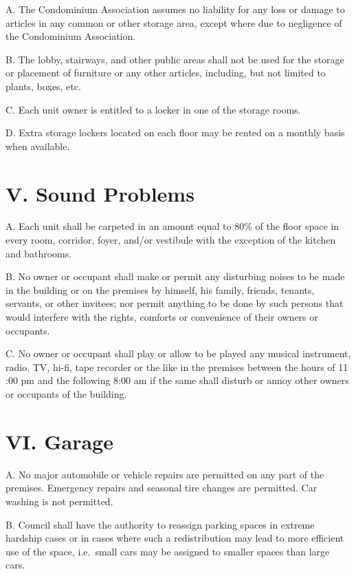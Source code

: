 \documentclass[
]{book}
\begin{document}
A. The Condominium Association assumes no liability for any loss or damage to articles in any common or other storage area, except where due to negligence of the Condominium Association.

B. The lobby, stairways, and other public areas shall not be used for the storage or placement of furniture or any other articles, including, but not limited to plants, boxes, etc.

C. Each unit owner is entitled to a locker in one of the storage rooms.

D. Extra storage lockers located on each floor may be rented on a monthly basis when available.

\hypertarget{v.-sound-problems-1}{%
\section*{V. Sound Problems}\label{v.-sound-problems-1}}

A. Each unit shall be carpeted in an amount equal to 80\% of the floor space in every room, corridor, foyer, and/or vestibule with the exception of the kitchen and bathrooms.

B. No owner or occupant shall make or permit any disturbing noises to be made in the building or on the premises by himself, his family, friends, tenants, servants, or other invitees; nor permit anything to be done by such persons that would interfere with the rights, comforts or convenience of their owners or occupants.

C. No owner or occupant shall play or allow to be played any musical instrument, radio, TV, hi-fi, tape recorder or the like in the premises between the hours of 11 :00 pm and the following 8:00 am if the same shall disturb or annoy other owners or occupants of the building.

\hypertarget{vi.-garage-1}{%
\section*{VI. Garage}\label{vi.-garage-1}}

A. No major automobile or vehicle repairs are permitted on any part of the premises. Emergency repairs and seasonal tire changes are permitted. Car washing is not permitted.

B. Council shall have the authority to reassign parking spaces in extreme hardship cases or in cases where such a redistribution may lead to more efficient use of the space, i.e.~small cars may be assigned to smaller spaces than large cars.
\end{document}
